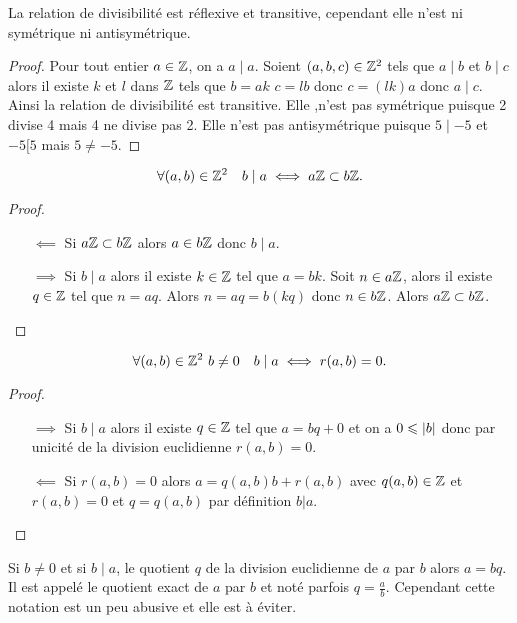 \begin{prop}
  La relation de divisibilité est réflexive et transitive, cependant elle n'est ni symétrique ni antisymétrique.
\end{prop}
\begin{proof}
  Pour tout entier \(a \in \mathbb{Z}\), on a \(a\mid a\). Soient \((a,b,c) \in \mathbb{Z}^2\) tels que \(a\mid b\) et \(b\mid c\) alors il existe \(k\) et \(l\) dans \(\mathbb{Z}\) tels que \(b=ak\) \(c=lb\) donc \(c=(lk)a\) donc \(a\mid c\). Ainsi la relation de divisibilité est transitive. Elle ,n'est pas symétrique puisque 2 divise 4 mais 4 ne divise pas 2. Elle n'est pas antisymétrique puisque \(5\mid -5\) et \(-5[5\) mais \(5 \neq -5\).
\end{proof}
\begin{prop}
  \begin{equation}
    \forall (a,b) \in \mathbb{Z}^2 \quad b\mid a \iff a\mathbb{Z} \subset b\mathbb{Z}.
  \end{equation}
\end{prop}
\begin{proof}
  \begin{itemize}
    \item[\(\impliedby\)] Si \(a\mathbb{Z} \subset b\mathbb{Z}\) alors \(a \in b\mathbb{Z}\) donc \(b\mid a\).
    \item[\(\implies\)] Si \(b\mid a\) alors il existe \(k \in \mathbb{Z}\) tel que \(a=bk\). Soit \(n \in a\mathbb{Z}\), alors il existe \(q \in \mathbb{Z}\) tel que \(n=aq\). Alors \(n=aq=b(kq)\) donc \(n \in b\mathbb{Z}\). Alors \(a\mathbb{Z} \subset b\mathbb{Z}\).
  \end{itemize}
\end{proof}
\begin{prop}
  \begin{equation}
    \forall (a,b) \in \mathbb{Z}^2 \ b\neq 0 \quad b\mid a \iff r(a,b)=0.
  \end{equation}
\end{prop}
\begin{proof}
  \begin{itemize}
    \item[\(\implies\)] Si \(b\mid a\) alors il existe \(q \in \mathbb{Z}\) tel que \(a=bq+0\) et on a \(0\leqslant \left\lvert b\right\rvert\) donc par unicité de la division euclidienne \(r(a,b)=0\).
    \item[\(\impliedby\)] Si \(r(a,b)=0\) alors \(a=q(a,b) b+r(a,b)\) avec \(q(a,b) \in \mathbb{Z}\) et \(r(a,b)=0\) et \(q=q(a,b)\) par définition \(b|a\).
  \end{itemize}
\end{proof}

Si \(b \neq 0\) et si \(b\mid a\), le quotient \(q\) de la division euclidienne de \(a\) par \(b\) alors \(a=bq\). Il est appelé le quotient exact de \(a\) par \(b\) et noté parfois \(q=\frac{a}{b}\). Cependant cette notation est un peu abusive et elle est à éviter.

